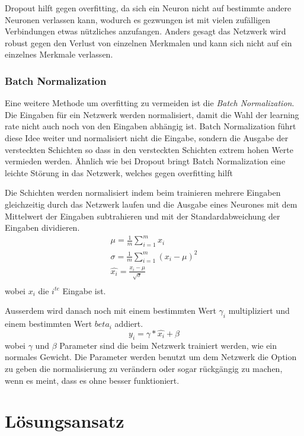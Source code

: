 \documentclass[12pt,a4paper]{report}
\begin{document}
Dropout hilft gegen overfitting,
da sich ein Neuron nicht auf bestimmte andere Neuronen verlassen kann,
wodurch es gezwungen ist mit vielen zufälligen Verbindungen etwas nützliches anzufangen.
Anders gesagt das Netzwerk wird robust gegen den Verlust von einzelnen Merkmalen und kann sich nicht auf ein einzelnes Merkmale verlassen.

\subsection{Batch Normalization}
Eine weitere Methode um overfitting zu vermeiden ist die \textit{Batch Normalization}.
Die Eingaben für ein Netzwerk werden normalisiert,
damit die Wahl der learning rate nicht auch noch von den Eingaben abhängig ist.
Batch Normalization führt diese Idee weiter und normalisiert nicht die Eingabe,
sondern die Ausgabe der versteckten Schichten
so dass in den versteckten Schichten extrem hohen Werte vermieden werden.\cite{batchnorm}
Ähnlich wie bei Dropout bringt Batch Normalization eine leichte Störung in das Netzwerk,
welches gegen overfitting hilft\cite{batchnorm}

Die Schichten werden normalisiert indem beim trainieren mehrere Eingaben gleichzeitig durch das Netzwerk laufen und
die Ausgabe eines Neurones mit dem Mittelwert der Eingaben subtrahieren und mit der Standardabweichung der Eingaben dividieren.\cite{batchnorm}
\begin{gather*}
    \mu = \frac{1}{m}\sum^m_{i=1}x_{i}\\
    \sigma = \frac{1}{m}\sum^m_{i=1}(x_i - \mu)^2\\
    \hat{x_i} = \frac{x_i - \mu}{\sqrt{\sigma}}\\
\end{gather*}
wobei $x_i$ die $i^{te}$ Eingabe ist.

Ausserdem wird danach noch mit einem bestimmten Wert $\gamma_i$ multipliziert und einem bestimmten Wert $beta_i$ addiert.
\[y_i = \gamma * \hat{x_i} + \beta \]
wobei $\gamma$ und $\beta$ Parameter sind die beim Netzwerk trainiert werden, wie ein normales Gewicht.\cite{batchnorm}
Die Parameter werden benutzt um dem Netzwerk die Option zu geben die normalisierung zu verändern oder sogar rückgängig zu machen, wenn es meint,
dass es ohne besser funktioniert.\cite{batchnorm_paper}

\chapter{Lösungsansatz}
\label{ch:lösungsansatz}
\end{document}
